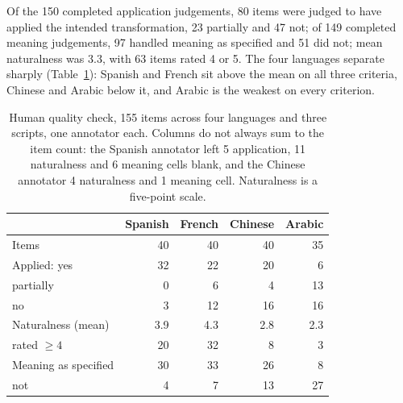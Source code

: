 Of the 150 completed application judgements, 80 items were judged to have
applied the intended transformation, 23 partially and 47 not; of 149
completed meaning judgements, 97 handled meaning as specified and 51 did
not; mean naturalness was $3.3$, with 63 items rated 4 or 5. The four
languages separate sharply (Table~\ref{tab:human}): Spanish and French
sit above the mean on all three criteria, Chinese and Arabic below it,
and Arabic is the weakest on every criterion.

\begin{table}[t]
\centering\small
\begin{tabular}{@{}lrrrr@{}}
\toprule
 & Spanish & French & Chinese & Arabic \\
\midrule
Items                & 40 & 40 & 40 & 35 \\
Applied: yes         & 32 & 22 & 20 &  6 \\
\quad partially      &  0 &  6 &  4 & 13 \\
\quad no             &  3 & 12 & 16 & 16 \\
Naturalness (mean)   & 3.9 & 4.3 & 2.8 & 2.3 \\
\quad rated $\geq 4$ & 20 & 32 &  8 &  3 \\
Meaning as specified & 30 & 33 & 26 &  8 \\
\quad not            &  4 &  7 & 13 & 27 \\
\bottomrule
\end{tabular}
\caption{Human quality check, 155 items across four languages and three
scripts, one annotator each. Columns do not always sum to the item count:
the Spanish annotator left 5 application, 11 naturalness and 6 meaning
cells blank, and the Chinese annotator 4 naturalness and 1 meaning cell.
Naturalness is a five-point scale.}
\label{tab:human}
\end{table}

%



